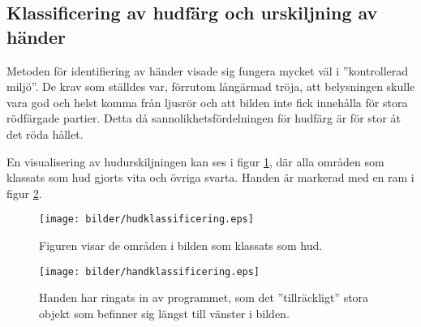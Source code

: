 \documentclass[../rapport_MVEX01-11-05]{subfiles}
\begin{document}
\subsection{Klassificering av hudfärg och urskiljning av händer}

Metoden för identifiering av händer visade sig fungera mycket väl i
''kontrollerad miljö''. De krav som ställdes var, förrutom långärmad
tröja, att belysningen skulle vara god och helst komma från ljusrör
och att bilden inte fick innehålla för stora rödfärgade partier. Detta
då sannolikhetsfördelningen för hudfärg är för stor åt det röda
hållet. 

En visualisering av hudurskiljningen kan ses i figur
\ref{fig:hudklassificering}, där alla områden som klassats som hud
gjorts vita och övriga svarta. Handen är markerad med en ram i figur
\ref{fig:handklassificering}.

\begin{figure}
	  \centering
		\label{fig:hudklassificering}
		\caption{Figuren visar de områden i bilden som
                  klassats som hud.}
    \texttt{[image: bilder/hudklassificering.eps]}
\end{figure}

\begin{figure}
	  \centering
		\label{fig:handklassificering}
		\caption{Handen har ringats in av programmet, som det
                  ''tillräckligt'' stora objekt som befinner sig
                  längst till vänster i bilden.}
    \texttt{[image: bilder/handklassificering.eps]}
\end{figure}
\end{document}
